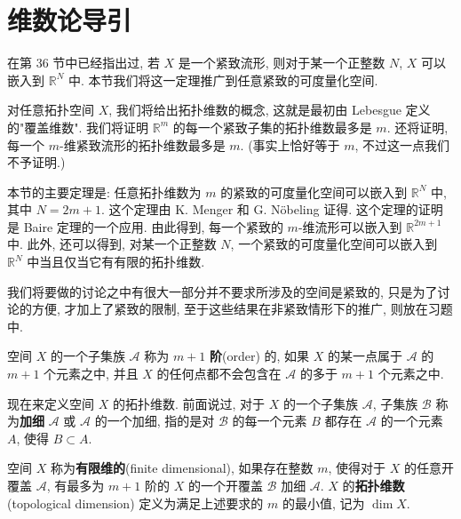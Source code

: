 ﻿\section{维数论导引}
\label{section:ch08-sec50}

在第 36 节中已经指出过, 若 $X$ 是一个紧致流形, 则对于某一个正整数 $N$, $X$ 可以嵌入到 $\mathbb{R}^{N}$ 中. 本节我们将这一定理推广到任意紧致的可度量化空间.

对任意拓扑空间 $X$, 我们将给出拓扑维数的概念, 这就是最初由 Lebesgue 定义的"覆盖维数". 我们将证明 $\mathbb{R}^{m}$ 的每一个紧致子集的拓扑维数最多是 $m$. 还将证明, 每一个 $m$-维紧致流形的拓扑维数最多是 $m$. (事实上恰好等于 $m$, 不过这一点我们不予证明.)

本节的主要定理是: 任意拓扑维数为 $m$ 的紧致的可度量化空间可以嵌入到 $\mathbb{R}^{N}$ 中, 其中 $N=2m+1$. 这个定理由 K. Menger 和 G. Nöbeling 证得. 这个定理的证明是 Baire 定理的一个应用. 由此得到, 每一个紧致的 $m$-维流形可以嵌入到 $\mathbb{R}^{2m+1}$ 中. 此外, 还可以得到, 对某一个正整数 $N$, 一个紧致的可度量化空间可以嵌入到 $\mathbb{R}^{N}$ 中当且仅当它有有限的拓扑维数.

我们将要做的讨论之中有很大一部分并不要求所涉及的空间是紧致的, 只是为了讨论的方便, 才加上了紧致的限制, 至于这些结果在非紧致情形下的推广, 则放在习题中.

\begin{definition}[集族的阶]
\label{definition:ch08-sec50-order}
空间 $X$ 的一个子集族 $\mathcal{A}$ 称为 $m+1$ \textbf{阶}(order) 的, 如果 $X$ 的某一点属于 $\mathcal{A}$ 的 $m+1$ 个元素之中, 并且 $X$ 的任何点都不会包含在 $\mathcal{A}$ 的多于 $m+1$ 个元素之中.

现在来定义空间 $X$ 的拓扑维数. 前面说过, 对于 $X$ 的一个子集族 $\mathcal{A}$, 子集族 $\mathcal{B}$ 称为\textbf{加细} $\mathcal{A}$ 或 $\mathcal{A}$ 的一个加细, 指的是对 $\mathcal{B}$ 的每一个元素 $B$ 都存在 $\mathcal{A}$ 的一个元素 $A$, 使得 $B\subset A$.

空间 $X$ 称为\textbf{有限维的}(finite dimensional), 如果存在整数 $m$, 使得对于 $X$ 的任意开覆盖 $\mathcal{A}$, 有最多为 $m+1$ 阶的 $X$ 的一个开覆盖 $\mathcal{B}$ 加细 $\mathcal{A}$. $X$ 的\textbf{拓扑维数}(topological dimension) 定义为满足上述要求的 $m$ 的最小值, 记为 $\dim X$.
\end{definition}

